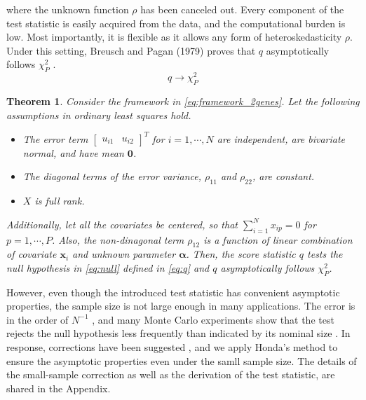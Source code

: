 \documentclass[aoas,preprint]{imsart}
\newtheorem{theorem}{Theorem}
\numberwithin{equation}{section}
\theoremstyle{plain}
\begin{document}
where the unknown function $\rho$ has been canceled out. Every component of the test statistic is easily acquired from the data, and the computational burden is low. Most importantly, it is flexible as it allows any form of heteroskedasticity $\rho$. Under this setting, Breusch and Pagan (1979)  proves that $q$ asymptotically follows $\chi_{P}^2$ \cite{breusch1979simple}.
\begin{equation}
q \rightarrow \chi_P^2
\label{asymptotic_q}
\end{equation}
\begin{theorem}
Consider the framework in \ref{eq:framework_2genes}. Let the following assumptions in ordinary least squares hold. 
\begin{itemize}
    \item The error term $\begin{bmatrix}u_{i1} & u_{i2} \end{bmatrix}^T$ for $i = 1, \cdots, N$ are independent, are bivariate normal, and have mean $\bm{0}$. 
    \item The diagonal terms of the error variance, $\rho_{11}$ and $\rho_{22}$, are constant.
    \item $X$ is full rank.
\end{itemize}
Additionally, let all the covariates be centered, so that $\sum_{i=1}^{N} x_{ip} = 0$ for $p = 1, \cdots, P$. Also, the non-dinagonal term $\rho_{12}$ is a function of linear combination of covariate $\bm{x}_i$ and unknown parameter $\bm{\alpha}$. Then, the score statistic $q$ tests the null hypothesis in \ref{eq:null} defined in \ref{eq:q} and $q$ asymptotically follows $\chi_P^2$. 
\label{theorem:q}
\end{theorem}
However, even though the introduced test statistic has convenient asymptotic properties, the sample size is not large enough in many applications. The error is in the order of $N^{-1}$ \cite{harris1985asymptotic}, and many Monte Carlo experiments show that the test rejects the null hypothesis less frequently than indicated by its nominal size \cite{ godfrey1978testing, griffiths1986monte,honda1988size} . In response, corrections have been suggested \cite{cribari2001monotonic,harris1985asymptotic,  honda1988size}, and we apply Honda's method to ensure the asymptotic properties even under the samll sample size. The details of the small-sample correction as well as the derivation of the test statistic, are shared in the Appendix.\\

\end{document}
